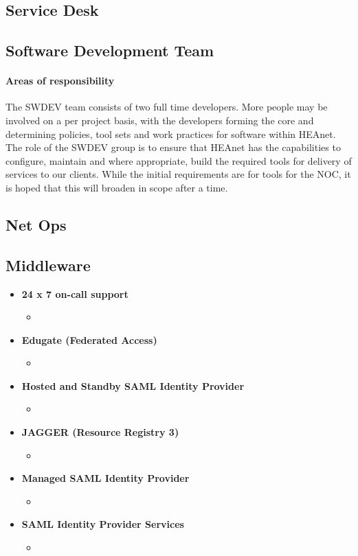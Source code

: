 \documentclass{article}
\begin{document}
\subsection{Service Desk}
\subsection{Software Development Team}
\paragraph{Areas of responsibility \newline}
The SWDEV team consists of two full time developers.
More people may be involved on a per project basis, with the developers forming the core and determining policies, tool sets and work practices for software within HEAnet.
The role of the SWDEV group is to ensure that HEAnet has the capabilities to configure, maintain and where appropriate, build the required tools for delivery of services to our clients. While the initial requirements are for tools for the NOC, it is hoped that this will broaden in scope after a time.
\subsection{Net Ops}
\subsection{Middleware}
\begin{itemize}
	\item \textbf{24 x 7  on-call support}
	      \begin{itemize}
	      	\item 	
	      \end{itemize}
	\item \textbf{Edugate (Federated Access)}
	      \begin{itemize}
	      	\item 	
	      \end{itemize}
	\item \textbf{Hosted and Standby SAML Identity Provider}
	      \begin{itemize}
	      	\item 	
	      \end{itemize}
	\item \textbf{JAGGER (Resource Registry 3)}
	      \begin{itemize}
	      	\item 	
	      \end{itemize}
	\item \textbf{Managed SAML Identity Provider}
	      \begin{itemize}
	      	\item 	
	      \end{itemize}
	\item \textbf{SAML Identity Provider Services}
	      \begin{itemize}
	      	\item 	
	      \end{itemize}
\end{itemize}
\end{document}
